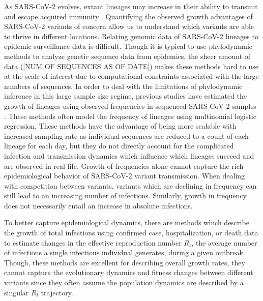 \documentclass[11pt,oneside,letterpaper]{article}
\begin{document}
As SARS-CoV-2 evolves, extant lineages may increase in their ability to transmit and escape acquired immunity \cite{Tegally2020}. %
Quantifying the observed growth advantages of SARS-CoV-2 variants of concern allow us to understand which variants are able to thrive in different locations.
Relating genomic data of SARS-CoV-2 lineages to epidemic surveillance data is difficult.
Though it is typical to use phylodynamic methods to analyze genetic sequence data from epidemics, the sheer amount of data ([NUM OF SEQUENCES AS OF DATE]) makes these methods hard to use at the scale of interest due to computational constraints associated with the large numbers of sequences.
In order to deal with the limitations of phylodynamic inference in this large sample size regime, previous studies have estimated the growth of lineages using observed frequencies in sequenced SARS-CoV-2 samples \cite{Annavajhala2021, Faria2021, Obermeyer2021, Ito2021}. %
These methods often model the frequency of lineages using multinomial logistic regression. \cite{Ito2021, Obermeyer2021}
These methods have the advantage of being more scalable with increased sampling rate as individual sequences are reduced to a count of each lineage for each day, but they do not directly account for the complicated infection and transmission dynamics which influence which lineages succeed and are observed in real life.
Growth of frequencies alone cannot capture the rich epidemiological behavior of SARS-CoV-2 variant transmission.
When dealing with competition between variants, variants which are declining in frequency can still lead to an increasing number of infections.
Similarly, growth in frequency does not necessarily entail an increase in absolute infections.

To better capture epidemiological dynamics, there are methods which describe the growth of total infections using confirmed case, hospitalization, or death data to estimate changes in the effective reproduction number $R_{t}$, the average number of infections a single infectious individual generates, during a given outbreak.
Though, these methods are excellent for describing overall growth rates, they cannot capture the evolutionary dynamics and fitness changes between different variants since they often assume the population dynamics are described by a singular $R_{t}$ trajectory. \cite{Cori2013, Abbott2020} %
\end{document}

